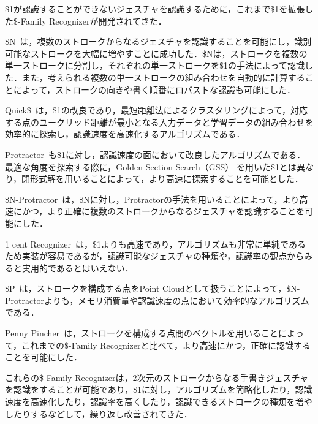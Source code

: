 \$1が認識することができないジェスチャを認識するために，これまで\$1を拡張した\$-Family Recognizerが開発されてきた．

\$N~\cite{Anthony:2010:LMR:1839214.1839258}は，複数のストロークからなるジェスチャを認識することを可能にし，識別可能なストロークを大幅に増やすことに成功した．\$Nは，ストロークを複数の単一ストロークに分割し，それぞれの単一ストロークを\$1の手法によって認識した．また，考えられる複数の単一ストロークの組み合わせを自動的に計算することによって，ストロークの向きや書く順番にロバストな認識も可能にした．

Quick\$~\cite{Reaver:2011:MQU:2021164.2021183}は，\$1の改良であり，最短距離法によるクラスタリングによって，対応する点のユークリッド距離が最小となる入力データと学習データの組み合わせを効率的に探索し，認識速度を高速化するアルゴリズムである．

Protractor~\cite{Li:2010:PFA:1753326.1753654}も\$1に対し，認識速度の面において改良したアルゴリズムである．最適な角度を探索する際に，Golden Section Search（GSS）\cite{Press:1992:NRC:148286}%
を用いた\$1とは異なり，閉形式解を用いることによって，より高速に探索することを可能とした．

\$N-Protractor~\cite{Anthony:2012:NFA:2305276.2305296}は，\$Nに対し，Protractorの手法を用いることによって，より高速にかつ，より正確に複数のストロークからなるジェスチャを認識することを可能にした．

1 cent Recognizer~\cite{Herold:2012:CRF:2331067.2331074}は，\$1よりも高速であり，アルゴリズムも非常に単純であるため実装が容易であるが，認識可能なジェスチャの種類や，認識率の観点からみると実用的であるとはいえない．

\$P~\cite{Vatavu:2012:GPC:2388676.2388732}は，ストロークを構成する点をPoint Cloudとして扱うことによって，\$N-Protractorよりも，メモリ消費量や認識速度の点において効率的なアルゴリズムである．

Penny Pincher~\cite{Taranta:2015:PPB:2788890.2788925}は，ストロークを構成する点間のベクトルを用いることによって，これまでの\$-Family Recognizerと比べて，より高速にかつ，正確に認識することを可能にした．

これらの\$-Family Recognizerは，2次元のストロークからなる手書きジェスチャを認識をすることが可能であり，\$1に対し，アルゴリズムを簡略化したり，認識速度を高速化したり，認識率を高くしたり，認識できるストロークの種類を増やしたりするなどして，繰り返し改善されてきた．

